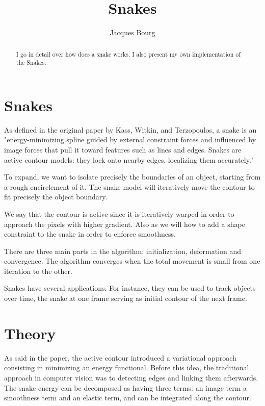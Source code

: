 \documentclass[24pt]{article}
\title{Snakes}
\author{Jacques Bourg}
\begin{document}
\maketitle

\begin{abstract}

I go in detail over how does a snake works. I also present my own implementation of the Snakes. 
\end{abstract}




\section{Snakes}

As defined in the original paper      \cite{Snake}  by 
 Kass,  Witkin, and Terzopoulos, a snake is an "energy-minimizing
spline guided by external constraint forces and influenced by image
forces that pull it toward features such as lines and edges. Snakes are active contour models: they lock
onto nearby edges, localizing them accurately."


To expand, we want to isolate precisely the boundaries of an object, starting from a rough encirclement of it. The snake model will iteratively move the contour to fit precisely the object boundary.  

We say that the contour is active since it is iteratively warped in order to approach the pixels with higher gradient. Also as we will how to add a shape constraint to the snake in order to enforce smoothness.

There are three main parts in the algorithm:  initialization, deformation and convergence. The algorithm converges when the total movement is small from one iteration to the other.  


Snakes have several applications. For instance, they can be used to track objects over time, the snake at one frame serving as initial contour of the next frame. 






\section{Theory}

As said in the paper, the active contour introduced a variational approach consisting in minimizing an energy functional.  Before this idea, the traditional approach in computer vision was to detecting edges and linking them afterwards. The snake energy can be decomposed as having three terms: an image term a smoothness term and an elastic term, and can be integrated along the contour.
\end{document}
